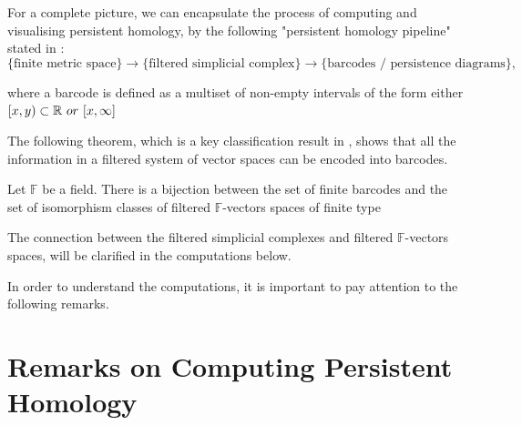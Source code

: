 \documentclass[11pt,a4paper]{report}
\begin{document}
              For a complete picture, we can encapsulate the process of computing and visualising persistent homology, by the following "persistent homology pipeline" stated in \cite{Rabadan_Blumberg_2019}:
              \[
               \{\textrm{finite metric space}\} \longrightarrow \{\textrm{filtered simplicial complex}\} \longrightarrow \{\textrm{barcodes / persistence diagrams}\},
              \]
              
              where a barcode is defined as a multiset of non-empty intervals of the form either
              $[x, y) \subset \mathbb{R} \ or \ [x, \infty]$
              
              The following theorem, which is a key classification result in \cite{Zomorodian_Carlsson_2005}, shows that all the information in a filtered system of vector spaces
              can be encoded into barcodes. 
              
              \begin{thm}
               Let $\mathbb{F}$ be a field. There is a bijection between the set of finite barcodes and
               the set of isomorphism classes of filtered $\mathbb{F}$-vectors spaces of finite type
              \end{thm}
              
              The connection between the filtered simplicial complexes and filtered $\mathbb{F}$-vectors spaces, will be clarified in the computations below. 
              
              In order to understand the computations, it is important to pay attention to the following remarks. 
            
              \section*{Remarks on Computing Persistent Homology}
              
\end{document}
